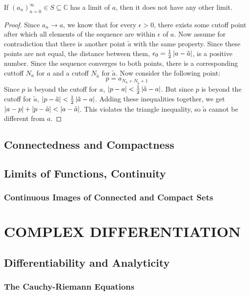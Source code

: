 \documentclass{refbook}
\begin{document}
\begin{theorem}
If $(a_n)^\infty_{n=0} \in S \subseteq \mathbb{C}$ has a limit of $a$, then it does not have any other limit.
\end{theorem}
\begin{proof}
Since $a_n \to a$, we know that for every $\epsilon > 0$, there exists some cutoff point after which all elements of the sequence are within $\epsilon$ of $a$. Now assume for contradiction that there is another point $\tilde{a}$ with the same property. Since these points are not equal, the distance between them, $\epsilon_0 = \frac{1}{2}\left\lvert a-\tilde{a} \right\rvert$, is a positive number. Since the sequence converges to both points, there is a corresponding cuttoff $N_{a}$ for $a$ and a cutoff $N_{\tilde{a}}$ for $\tilde{a}$. Now consider the following point:
\begin{equation*} p = a_{N_{a}+N_{\tilde{a}}+1} \end{equation*}
Since $p$ is beyond the cutoff for $a$, $\left\lvert p-a \right\rvert<\frac{1}{2}\left\lvert \tilde{a}-a \right\rvert$. But since $p$ is beyond the cutoff for $\tilde{a}$, $\left\lvert p-\tilde{a} \right\rvert < \frac{1}{2}\left\lvert \tilde{a}-a \right\rvert$. Adding these inequalities together, we get $\left\lvert a-p \right\rvert+\left\lvert p-\tilde{a} \right\rvert < \left\lvert a-\tilde{a} \right\rvert$. This violates the triangle inequality, so $\tilde{a}$ cannot be different from $a$.
\end{proof}
\subsection{Connectedness and Compactness}
\subsection{Limits of Functions, Continuity}
\subsubsection{Continuous Images of Connected and Compact Sets}


\section{COMPLEX DIFFERENTIATION}
\subsection{Differentiability and Analyticity}
\subsubsection{The Cauchy-Riemann Equations}
\end{document}
